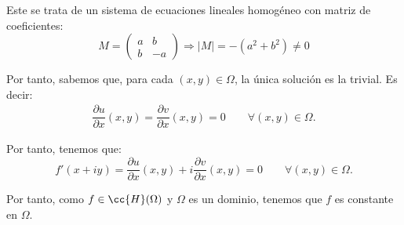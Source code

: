 \begin{ejercicio}
    Este se trata de un sistema de ecuaciones lineales homogéneo con matriz de coeficientes:
    \[
        M = \begin{pmatrix}
            a & b\\
            b & -a
        \end{pmatrix}
        \Longrightarrow
        |M|=-(a^2+b^2)\neq 0
    \]

    Por tanto, sabemos que, para cada $(x,y)\in\Omega$, la única solución es la trivial. Es decir:
    \begin{align*}
        \dfrac{\partial u}{\partial x}(x,y) = \dfrac{\partial v}{\partial x}(x,y) = 0\qquad \forall (x,y)\in\Omega.
    \end{align*}

    Por tanto, tenemos que:
    \begin{equation*}
        f'(x+iy) = \dfrac{\partial u}{\partial x}(x,y) + i\dfrac{\partial v}{\partial x}(x,y) = 0\qquad \forall (x,y)\in\Omega.
    \end{equation*}

    Por tanto, como $f\in \cc{H}(\Omega)$ y $\Omega$ es un dominio, tenemos que $f$ es constante en $\Omega$.
\end{ejercicio}

